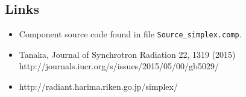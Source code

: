\subsection*{Links}
\begin{itemize}
  \item Component source code found in file \texttt{Source\_simplex.comp}.
  \item Tanaka, Journal of Synchrotron Radiation 22, 1319 (2015) http://journals.iucr.org/s/issues/2015/05/00/gb5029/
  \item http://radiant.harima.riken.go.jp/simplex/
\end{itemize}
